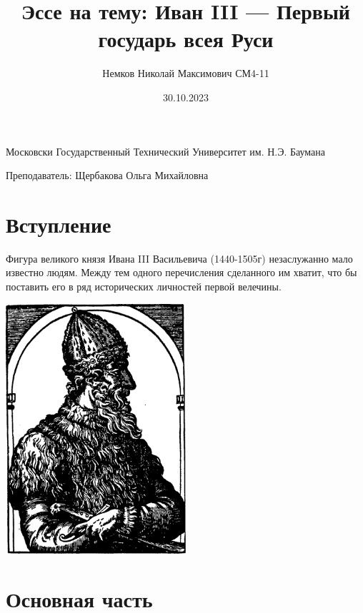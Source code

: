 

\title{Эссе на тему: Иван III --- Первый государь всея Руси}
\author{Немков Николай Максимович СМ4-11}

\date{30.10.2023}



\maketitle
\begin{center}
Московски Государственный Технический Университет им. Н.Э. Баумана

Преподаватель: Щербакова Ольга Михайловна
\end{center}
\newpage
\tableofcontents

\newpage
\section{Вступление}
			Фигура великого князя Ивана III Васильевича (1440-1505г) незаслужанно мало известно людям. Между тем одного перечисления сделанного им хватит, что бы поставить его в ряд исторических личностей первой велечины.


    \begin{center}
	\includegraphics[width=0.5\textwidth]{images/ivan2-1}
    \end{center}

\newpage
\section{Основная часть}

